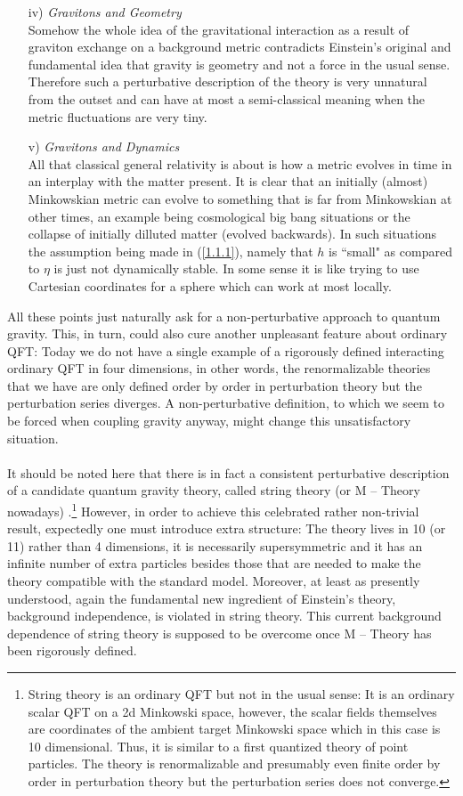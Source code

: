 \documentclass[12pt]{report}
\begin{document}
\begin{itemize}
%
\item[iv)] {\it Gravitons and Geometry}\\
Somehow the whole idea of the gravitational interaction as a result 
of graviton exchange on a background metric contradicts Einstein's 
original and fundamental
idea that gravity is geometry and not a force in the usual sense.
Therefore such a perturbative description of the theory is very unnatural
from the outset and can have at most a semi-classical meaning when 
the metric fluctuations are very tiny.
%
\item[v)] {\it Gravitons and Dynamics}\\
All that classical general relativity is about is how a metric evolves in 
time in an interplay with the matter present. It is clear that an 
initially (almost) Minkowskian metric can evolve to something that is far 
from Minkowskian at other times, an example being cosmological big bang
situations or the collapse of initially dilluted matter (evolved 
backwards). In 
such situations the assumption being made in (\ref{1.1.1}), namely that
$h$ is ``small" as compared to $\eta$ is just not dynamically stable.
In some sense it is like trying to use Cartesian coordinates for a sphere
which can work at most locally. 
%
\end{itemize}
%
All these points just naturally ask for a non-perturbative approach to
quantum gravity. This, in turn, could also cure another unpleasant feature 
about ordinary QFT: Today we do not have a single example of a rigorously
defined interacting ordinary QFT in four dimensions, in other words, the 
renormalizable theories that we have are only defined order by order in 
perturbation theory but the perturbation series diverges. A 
non-perturbative definition, to which we seem to be forced when coupling 
gravity 
anyway, might change this unsatisfactory situation. \\ 
\\ 
It should be noted here that there is in fact a 
consistent perturbative description of a candidate quantum gravity theory, 
called string
theory (or M -- Theory nowadays) \cite{7}.\footnote{String theory
is an ordinary QFT but not in the usual sense: It is an ordinary
scalar QFT on a 2d Minkowski space, however, the scalar fields themselves
are coordinates of the ambient target Minkowski space which in this case 
is 10 dimensional. Thus, it is similar to a first quantized theory
of point particles. The theory is renormalizable and presumably 
even finite order by order in 
perturbation theory but the perturbation series does not converge.} 
However, in order to achieve 
this celebrated rather non-trivial result, expectedly one must introduce 
extra 
structure: The theory lives in 10 (or 11) rather than 4 dimensions, it is 
necessarily supersymmetric and it has an infinite number of extra 
particles besides those that are needed to make the theory compatible 
with the standard model. Moreover, at least as presently understood, 
again the fundamental new 
ingredient of Einstein's theory, background independence, is 
violated in string theory. This current background dependence of string 
theory is supposed to be overcome once M -- Theory has been rigorously 
defined.
\end{document}

